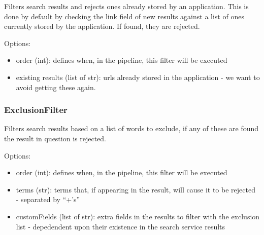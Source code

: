 \documentclass[letterpaper,10pt,english]{sphinxmanual}
\begin{document}
\begin{fulllineitems}
\label{api3.0:puppy.result.filter.DuplicateFilter}
Filters search results and rejects ones already stored by an application. This is done by default by checking the link field
of new results against a list of ones currently stored by the application. If found, they are rejected.

Options:
\begin{itemize}
\item {} 
order (int): defines when, in the pipeline, this filter will be executed

\item {} 
existing results (list of str): urls already stored in the application - we want to avoid getting these again.

\end{itemize}

\end{fulllineitems}



\subsubsection{ExclusionFilter}
\label{api3.0:exclusionfilter}

\begin{fulllineitems}
\label{api3.0:puppy.result.filter.ExclusionFilter}
Filters search results based on a list of words to exclude, if any of these are found the
result in question is rejected.

Options:
\begin{itemize}
\item {} 
order (int): defines when, in the pipeline, this filter will be executed

\item {} 
terms (str): terms that, if appearing in the result, will cause it to be rejected - separated by ``+'s''

\item {} 
customFields (list of str): extra fields in the results to filter with the exclusion list - depedendent upon their existence in the search service results

\end{itemize}

\end{fulllineitems}
\end{document}
